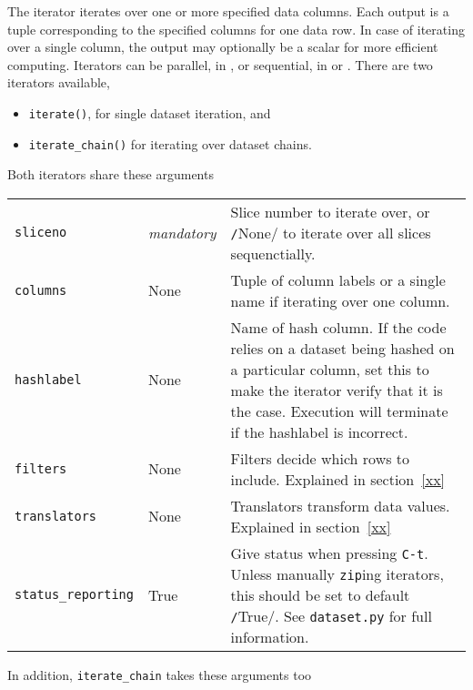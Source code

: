 The iterator iterates over one or more specified data columns.  Each
output is a tuple corresponding to the specified columns for one data
row.  In case of iterating over a single column, the output may
optionally be a scalar for more efficient computing.  Iterators can be
parallel, in \analysis, or sequential, in \prepare or \synthesis.
There are two iterators available,
\begin{itemize}
\item [] \texttt{iterate()}, for  single dataset iteration, and
\item [] \texttt{iterate\_chain()} for iterating over dataset chains.
\end{itemize}
Both iterators share these arguments
\begin{snugshade}
\begin{tabular}{llp{6cm}}

  \texttt{sliceno} & \textsl{mandatory} & Slice number to iterate
  over, or \texttt/None/ to iterate over all slices
  sequenctially. \\

  \texttt{columns} & None & Tuple of column labels or a single name if
  iterating over one column.\\

  \texttt{hashlabel} & None & Name of hash column.  If the code relies
  on a dataset being hashed on a particular column, set this to make
  the iterator verify that it is the case.  Execution will terminate
  if the hashlabel is incorrect.\\
  
  \texttt{filters} & None & Filters decide which rows to include.
  Explained in section~\ref{xx}\\

  \texttt{translators} & None & Translators transform data values.
  Explained in section~\ref{xx}\\
  
  \texttt{status\_reporting} & True & Give status when pressing
  \texttt{C-t}.  Unless manually \texttt{zip}ing iterators, this
  should be set to default \texttt/True/.  See
  \texttt{dataset.py} for full information.\\
\end{tabular}
\end{snugshade}
In addition, \texttt{iterate\_chain} takes these arguments too
